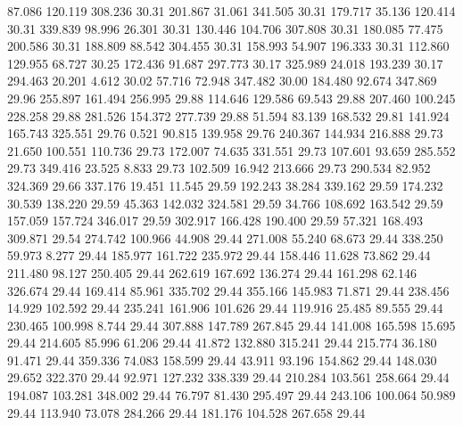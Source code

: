   87.086  120.119  308.236        30.31
 201.867   31.061  341.505        30.31
 179.717   35.136  120.414        30.31
 339.839   98.996   26.301        30.31
 130.446  104.706  307.808        30.31
 180.085   77.475  200.586        30.31
 188.809   88.542  304.455        30.31
 158.993   54.907  196.333        30.31
 112.860  129.955   68.727        30.25
 172.436   91.687  297.773        30.17
 325.989   24.018  193.239        30.17
 294.463   20.201    4.612        30.02
  57.716   72.948  347.482        30.00
 184.480   92.674  347.869        29.96
 255.897  161.494  256.995        29.88
 114.646  129.586   69.543        29.88
 207.460  100.245  228.258        29.88
 281.526  154.372  277.739        29.88
  51.594   83.139  168.532        29.81
 141.924  165.743  325.551        29.76
   0.521   90.815  139.958        29.76
 240.367  144.934  216.888        29.73
  21.650  100.551  110.736        29.73
 172.007   74.635  331.551        29.73
 107.601   93.659  285.552        29.73
 349.416   23.525    8.833        29.73
 102.509   16.942  213.666        29.73
 290.534   82.952  324.369        29.66
 337.176   19.451   11.545        29.59
 192.243   38.284  339.162        29.59
 174.232   30.539  138.220        29.59
  45.363  142.032  324.581        29.59
  34.766  108.692  163.542        29.59
 157.059  157.724  346.017        29.59
 302.917  166.428  190.400        29.59
  57.321  168.493  309.871        29.54
 274.742  100.966   44.908        29.44
 271.008   55.240   68.673        29.44
 338.250   59.973    8.277        29.44
 185.977  161.722  235.972        29.44
 158.446   11.628   73.862        29.44
 211.480   98.127  250.405        29.44
 262.619  167.692  136.274        29.44
 161.298   62.146  326.674        29.44
 169.414   85.961  335.702        29.44
 355.166  145.983   71.871        29.44
 238.456   14.929  102.592        29.44
 235.241  161.906  101.626        29.44
 119.916   25.485   89.555        29.44
 230.465  100.998    8.744        29.44
 307.888  147.789  267.845        29.44
 141.008  165.598   15.695        29.44
 214.605   85.996   61.206        29.44
  41.872  132.880  315.241        29.44
 215.774   36.180   91.471        29.44
 359.336   74.083  158.599        29.44
  43.911   93.196  154.862        29.44
 148.030   29.652  322.370        29.44
  92.971  127.232  338.339        29.44
 210.284  103.561  258.664        29.44
 194.087  103.281  348.002        29.44
  76.797   81.430  295.497        29.44
 243.106  100.064   50.989        29.44
 113.940   73.078  284.266        29.44
 181.176  104.528  267.658        29.44
